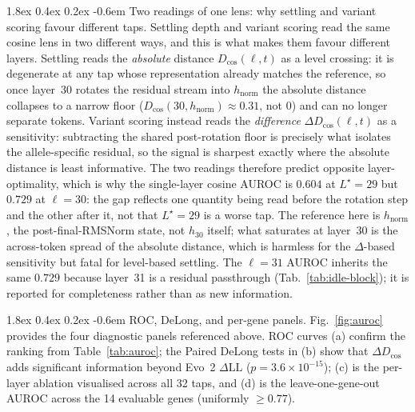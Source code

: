 \documentclass{article}
\makeatletter
\renewcommand\paragraph{\@startsection{paragraph}{4}{\z@}%
  {1.8ex \@plus 0.4ex \@minus 0.2ex}%
  {-0.6em}%
{\normalfont\normalsize\bfseries}}
\theoremstyle{plain}
\theoremstyle{definition}
\theoremstyle{remark}
\newcommand{\hnorm}{h_{\mathrm{norm}}}
\newcommand{\Dcos}{D_{\cos}}
\newcommand{\DDcos}{\Delta D_{\cos}}
\makeatother
\begin{document}
\paragraph{Two readings of one lens: why settling and variant scoring favour different taps.}
Settling depth and variant scoring read the same cosine lens in two
different ways, and this is what makes them favour different layers.
Settling reads the \emph{absolute} distance $\Dcos(\ell,t)$ as a level
crossing: it is degenerate at any tap whose representation already
matches the reference, so once layer~30 rotates the residual stream into
$\hnorm$ the absolute distance collapses to a narrow floor
($\Dcos(30,\hnorm)\!\approx\!0.31$, not $0$) and can no longer separate
tokens. Variant scoring instead reads the \emph{difference}
$\DDcos(\ell,t)$ as a sensitivity: subtracting the shared post-rotation
floor is precisely what isolates the allele-specific residual, so the
signal is sharpest exactly where the absolute distance is least
informative. The two readings therefore predict opposite
layer-optimality, which is why the single-layer cosine AUROC is $0.604$
at $L^{\star}\!=\!29$ but $0.729$ at $\ell\!=\!30$: the gap reflects one
quantity being read before the rotation step and the other after it, not
that $L^{\star}\!=\!29$ is a worse tap. The reference here is $\hnorm$, the
post-final-RMSNorm state, not $h_{30}$ itself; what saturates at
layer~30 is the across-token spread of the absolute distance, which is
harmless for the $\Delta$-based sensitivity but fatal for level-based
settling. The $\ell\!=\!31$ AUROC inherits the same $0.729$ because
layer~31 is a residual passthrough (Tab.~\ref{tab:idle-block}); it is
reported for completeness rather than as new information.

\paragraph{ROC, DeLong, and per-gene panels.}
Fig.~\ref{fig:auroc} provides the four diagnostic panels referenced
above. ROC curves (a) confirm the ranking from
Table~\ref{tab:auroc}; the Paired DeLong tests in (b) show that
$\DDcos$ adds significant information beyond Evo~2 $\Delta\textrm{LL}$
($p\!=\!3.6\!\times\!10^{-15}$); (c) is the per-layer ablation visualised
across all 32 taps, and (d) is the leave-one-gene-out AUROC across the
14 evaluable genes (uniformly $\ge 0.77$).
\end{document}

